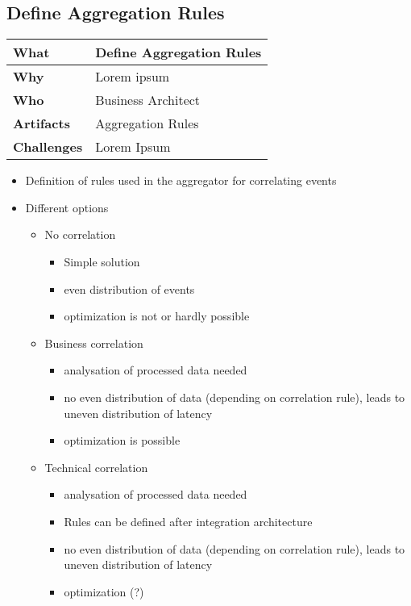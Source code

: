\subsection{Define Aggregation Rules}
\begin{minipage}{\textwidth}
 \label{table:ch6_Task_Define_Aggregation_Rules}
\begin{tabular}
	{|m{3cm}|m{10cm}|} \hline \bfseries What & Define Aggregation Rules\\
	\hline \bfseries Why & Lorem ipsum\\
	\hline \bfseries Who & Business Architect\\
	\hline \bfseries Artifacts & Aggregation Rules\\
	\hline \bfseries Challenges & Lorem Ipsum\\
	\hline 
\end{tabular}
\end{minipage}

\begin{itemize}
	\item Definition of rules used in the aggregator for correlating events
	\item Different options
	\begin{itemize}
		\item No correlation
		\begin{itemize}
			\item Simple solution
			\item even distribution of events
			\item optimization is not or hardly possible
		\end{itemize}
		\item Business correlation
		\begin{itemize}
			\item analysation of processed data needed
			\item no even distribution of data (depending on correlation rule), leads to uneven distribution of latency
			\item optimization is possible
		\end{itemize}
		\item Technical correlation
		\begin{itemize}
			\item analysation of processed data needed
			\item Rules can be defined after integration architecture
			\item no even distribution of data (depending on correlation rule), leads to uneven distribution of latency
			\item optimization (?)
		\end{itemize}
	\end{itemize}
\end{itemize}

